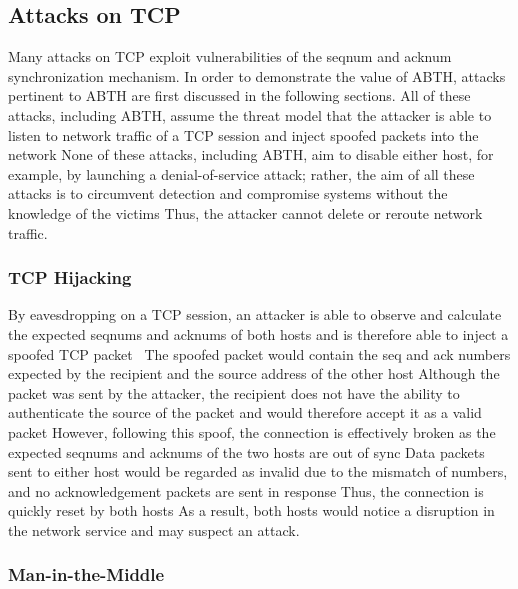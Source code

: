 \documentclass{sig-alternate}
\begin{document}
\subsection{Attacks on TCP}

Many attacks on TCP exploit vulnerabilities of the seqnum and acknum synchronization mechanism.
In order to demonstrate the value of ABTH, attacks pertinent to ABTH are first discussed in the following sections.
All of these attacks, including ABTH, assume the threat model that the attacker is able to listen to network traffic of a TCP session and inject spoofed packets into the network
None of these attacks, including ABTH, aim to disable either host, for example, by launching a denial-of-service attack; rather, the aim of all these attacks is to circumvent detection and compromise systems without the knowledge of the victims
Thus, the attacker cannot delete or reroute network traffic.

\subsubsection{TCP Hijacking}

By eavesdropping on a TCP session, an attacker is able to observe and calculate the expected seqnums and acknums of both hosts and is therefore able to inject a spoofed TCP packet~\cite{harris:tcpattacks}
The spoofed packet would contain the seq and ack numbers expected by the recipient and the source address of the other host
Although the packet was sent by the attacker, the recipient does not have the ability to authenticate the source of the packet and would therefore accept it as a valid packet
However, following this spoof, the connection is effectively broken as the expected seqnums and acknums of the two hosts are out of sync
Data packets sent to either host would be regarded as invalid due to the mismatch of numbers, and no acknowledgement packets are sent in response
Thus, the connection is quickly reset by both hosts
As a result, both hosts would notice a disruption in the network service and may suspect an attack.

\subsubsection{Man-in-the-Middle}
\end{document}
